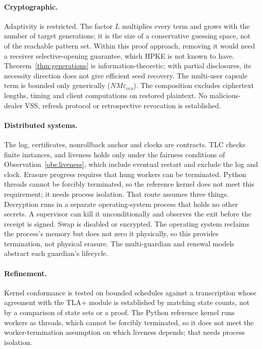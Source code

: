 \documentclass[pdflatex,sn-mathphys-num,twocolumn]{sn-jnl}
\theoremstyle{plain}
\theoremstyle{definition}
\begin{document}
\paragraph{Cryptographic.}
Adaptivity is restricted. The factor $L$ multiplies every term and grows with the number of target generations; it is the size of a conservative guessing space, not of the reachable pattern set. Within this proof approach, removing it would need a receiver selective-opening guarantee, which HPKE is not known to have. Theorem~\ref{thm:generations} is information-theoretic; with partial disclosures, its necessity direction does not give efficient seed recovery. The multi-user capsule term is bounded only generically ($NM\varepsilon_{\mathrm{cca}}$). The composition excludes ciphertext lengths, timing and client computations on restored plaintext. No malicious-dealer VSS, refresh protocol or retrospective revocation is established.

\paragraph{Distributed systems.}
The log, certificates, nonrollback anchor and clocks are contracts. TLC checks finite instances, and liveness holds only under the fairness conditions of Observation~\ref{obs:liveness}, which include eventual restart and exclude the log and clock. Erasure progress requires that hung workers can be terminated. Python threads cannot be forcibly terminated, so the reference kernel does not meet this requirement; it needs process isolation. That route assumes three things. Decryption runs in a separate operating-system process that holds no other secrets. A supervisor can kill it unconditionally and observes the exit before the receipt is signed. Swap is disabled or encrypted. The operating system reclaims the process's memory but does not zero it physically, so this provides termination, not physical erasure. The multi-guardian and renewal models abstract each guardian's lifecycle.

\paragraph{Refinement.}
Kernel conformance is tested on bounded schedules against a transcription whose agreement with the TLA+ module is established by matching state counts, not by a comparison of state sets or a proof. The Python reference kernel runs workers as threads, which cannot be forcibly terminated, so it does not meet the worker-termination assumption on which liveness depends; that needs process isolation.
\end{document}
